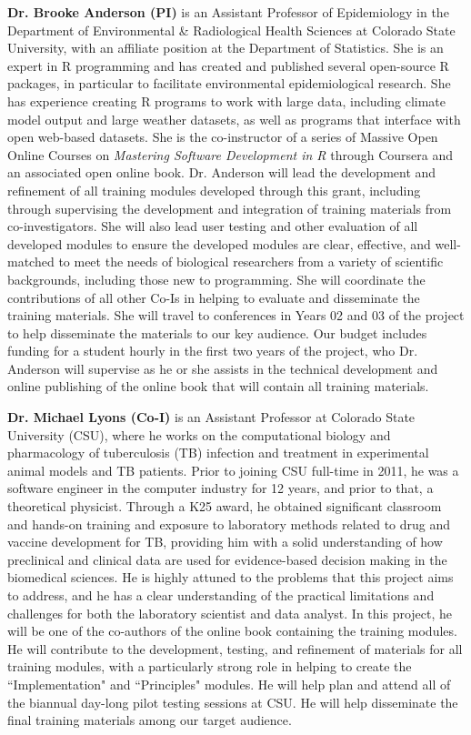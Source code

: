 \documentclass[pdftex,english,11pt,parskip=half]{scrartcl}
\begin{document}
\noindent \textbf{Dr. Brooke Anderson (PI)} is an Assistant Professor of Epidemiology in the Department of Environmental \& Radiological Health Sciences at Colorado State University, with an affiliate position at the Department of Statistics. She is an expert in R programming and has created and published several open-source R packages, in particular to facilitate environmental epidemiological research. She has experience creating R programs to work with large data, including climate model output and large weather datasets, as well as programs that interface with open web-based datasets. She is the co-instructor of a series of Massive Open Online Courses on \textit{Mastering Software Development in R} through Coursera and an associated open online book. Dr. Anderson will lead the development and refinement of all training modules developed through this grant, including through supervising the development and integration of training materials from co-investigators. She will also lead user testing and other evaluation of all developed modules to ensure the developed modules are clear, effective, and well-matched to meet the needs of biological researchers from a variety of scientific backgrounds, including those new to programming. She will coordinate the contributions of all other Co-Is in helping to evaluate and disseminate the training materials. She will travel to conferences in Years 02 and 03 of the project to help disseminate the materials to our key audience. Our budget includes funding for a student hourly in the first two years of the project, who Dr. Anderson will supervise as he or she assists in the technical development and online publishing of the online book that will contain all training materials.

\noindent \textbf{Dr. Michael Lyons (Co-I)} is an Assistant Professor at Colorado State University (CSU), where he works on the computational biology and pharmacology of tuberculosis (TB) infection and treatment in experimental animal models and TB patients. Prior to joining CSU full-time in 2011, he was a software engineer in the computer industry for 12 years, and prior to that, a theoretical physicist. Through a K25 award, he obtained significant classroom and hands-on training and exposure to laboratory methods related to drug and vaccine development for TB, providing him with a solid understanding of how preclinical and clinical data are used for evidence-based decision making in the biomedical sciences. He is highly attuned to the problems that this project aims to address, and he has a clear understanding of the practical limitations and challenges for both the laboratory scientist and data analyst. In this project, he will be one of the co-authors of the online book containing the training modules. He will contribute to the development, testing, and refinement of materials for all training modules, with a particularly strong role in helping to create the ``Implementation" and ``Principles" modules. He will help plan and attend all of the biannual day-long pilot testing sessions at CSU. He will help disseminate the final training materials among our target audience. 
\end{document}
